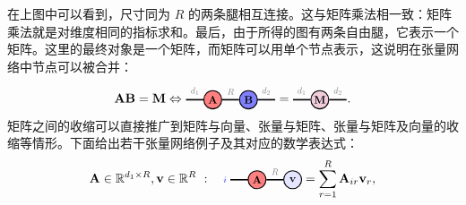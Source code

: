  在上图中可以看到，尺寸同为 $R$ 的两条腿相互连接。这与矩阵乘法相一致：矩阵乘法就是对维度相同的指标求和。最后，由于所得的图有两条自由腿，它表示一个矩阵。这里的最终对象是一个矩阵，而矩阵可以用单个节点表示，这说明在张量网络中节点可以被合并：
$$
\Ab\Bb =\Mb \Leftrightarrow 
\begin{tikzpicture}[baseline=\baseline]
   \tikzset{tensor/.style = {minimum size = 0.5cm,shape = circle,thick,draw=black,inner sep = 0pt}, edge/.style = {thick,line width=.4mm},every loop/.style={}}
    \def\y{0}
    \def\x{0}
    \node[tensor,fill=red!50!white] (A) at (\x,\y){\scalebox{0.85}{$\Ab$}};
    \node[tensor,fill=blue!50!white] (B) at (\x+1,\y){\scalebox{0.85}{$\Bb$}};
    \draw[edge] (A) -- (B) node [above,midway] {\scalebox{0.7}{\dimcolor{$R$}}};
    \draw[edge] (\x-0.25,\y) -- (\x-0.75,\y)  node [midway, above] {\scalebox{0.7}{\dimcolor{$d_1$}}};
    \draw[edge] (\x+1.25,\y) -- (\x+1.75,\y)  node [midway,above] {\scalebox{0.7}{\dimcolor{$d_2$}}};
    \node[draw=none] () at (\x+2,\y) {\scalebox{1}{\textcolor{black}{$=$}}};
    \node[tensor,fill=blue!30!red!20!white] (M) at (\x+3,\y){\scalebox{0.85}{$\Mb$}};
    \draw[edge] (M) -- (\x+3.75,\y)  node [midway,above] {\scalebox{0.7}{\dimcolor{$d_2$}}};
    \draw[edge] (M) -- (\x+2.25,\y)  node [midway,above] {\scalebox{0.7}{\dimcolor{$d_1$}}};
    \end{tikzpicture}.
$$
矩阵之间的收缩可以直接推广到矩阵与向量、张量与矩阵、张量与矩阵及向量的收缩等情形。下面给出若干张量网络例子及其对应的数学表达式：
\begin{align}\label{eq:matvec}
\Ab\in\RR^{d_1\times R},\vb\in\RR^{R} \ : \ \
\begin{tikzpicture}[baseline=\baseline]
   \tikzset{tensor/.style = {minimum size = 0.5cm,shape = circle,thick,draw=black,inner sep = 0pt}, edge/.style = {thick,line width=.4mm},every loop/.style={}}
    \def\y{0}
    \def\x{0}
    \node[tensor,fill=red!50!white] (A) at (\x,\y){\scalebox{0.85}{$\Ab$}};
    \node[tensor,fill=blue!10!white] (v) at (\x+1,\y){\scalebox{0.85}{$\vb$}};
    \draw[edge] (A) -- (v) node [above,midway] {\scalebox{0.7}{\dimcolor{$R$}}};
    \draw[edge] (\x-0.25,\y) -- (\x-0.75,\y)  node [pos=1.3]{\scalebox{0.7}{\indcolor{$i$}}};
    \end{tikzpicture}
=\sum_{r=1}^R\Ab_{ir}\vb_r,
\end{align}
